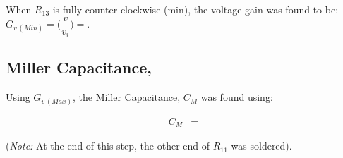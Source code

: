 \subsubsection{}
When $R_{13}$ is fully counter-clockwise (min), the voltage gain was found to be:
$G_{v\, (Min)} = \bigg(\dfrac{v}{v_i}\bigg) = \boxed{}$.

\subsection{Miller Capacitance, }

Using $G_{v\,(Max)}$, the Miller Capacitance, $C_M$ was found using:

\begin{align*}
 C_M &=
\end{align*}

(\emph{Note:} At the end of this step, the other end of $R_{11}$ was soldered).
